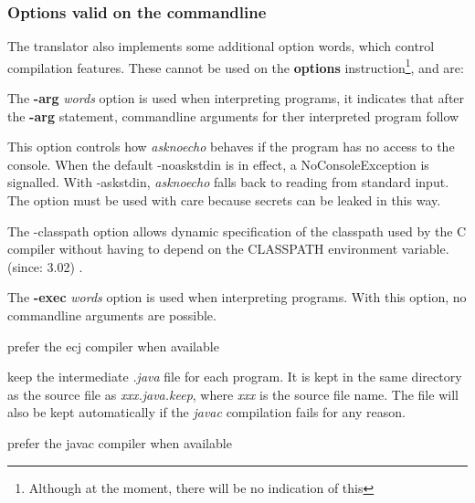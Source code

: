 \subsubsection{Options valid on the commandline}
The translator also implements some additional option words, which
control compilation features.  These cannot be used on the
\textbf{options} instruction\footnote{Although at the moment, there will be no indication of this}, and are:
\begin{description}
\item[arg]
The \textbf{-arg} \emph{words} option is used when interpreting
programs, it indicates that after the \textbf{-arg} statement,
commandline arguments for ther interpreted program follow
\item[askstdin]
This option controls how \emph{asknoecho} behaves if the program has no access
to the console. When the default -noaskstdin is in effect, a NoConsoleException is signalled.
With -askstdin, \emph{asknoecho} falls back to reading from standard input. The option must
be used with care because secrets can be leaked in this way.

\item[classpath]
The -classpath option allows dynamic specification of the classpath
used by the \nr{}C compiler without having to depend on the
CLASSPATH environment variable. (since: \nr{} 3.02)
.
\item[exec]
The \textbf{-exec} \emph{words} option is used when interpreting
programs. With this option, no commandline arguments are possible.
\item[ecj]
prefer the ecj compiler when available 

\item[keep]
keep the intermediate \emph{.java} file for each program.  It is kept in
the same directory as the \nr{} source file as \emph{xxx.java.keep},
where \emph{xxx} is the source file name.  The file will also be kept
automatically if the \emph{javac} compilation fails for any reason.
\item[javac]
prefer the javac compiler when available


\end{description}
